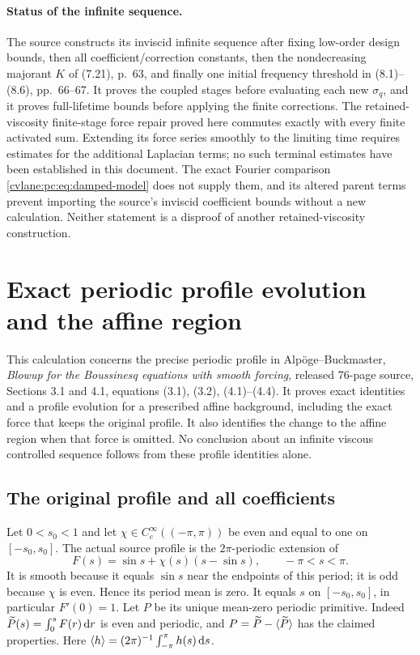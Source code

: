 \paragraph{Status of the infinite sequence.}
The source constructs its inviscid infinite sequence after fixing low-order design bounds, then all coefficient/correction constants, then the nondecreasing majorant $K$ of (7.21), p.~63, and finally one initial frequency threshold in (8.1)--(8.6), pp.~66--67. It proves the coupled stages before evaluating each new $\sigma_q$, and it proves full-lifetime bounds before applying the finite corrections. The retained-viscosity finite-stage force repair proved here commutes exactly with every finite activated sum. Extending its force series smoothly to the limiting time requires estimates for the additional Laplacian terms; no such terminal estimates have been established in this document. The exact Fourier comparison \eqref{cvlane:pc:eq:damped-model} does not supply them, and its altered parent terms prevent importing the source's inviscid coefficient bounds without a new calculation. Neither statement is a disproof of another retained-viscosity construction.


\section{Exact periodic profile evolution and the affine region}
This calculation concerns the precise periodic profile in Alp\"oge--Buckmaster,
\emph{Blowup for the Boussinesq equations with smooth forcing}, released
76-page source, Sections 3.1 and 4.1, equations (3.1), (3.2), (4.1)--(4.4).
It proves exact identities and a profile evolution for a prescribed affine
background, including the exact force that keeps the original profile.
It also identifies the change to the affine region when that force is
omitted. No conclusion about an infinite viscous controlled sequence follows
from these profile identities alone.

\subsection{The original profile and all coefficients}

Let $0<s_0<1$ and let $\chi\in C_c^\infty((-\pi,\pi))$ be even and equal to
one on $[-s_0,s_0]$. The actual source profile is the $2\pi$-periodic extension
of
\begin{equation}\label{cvlane:pd:eq:F}
 F(s)=\sin s+\chi(s)(s-\sin s),\qquad -\pi<s<\pi.
\end{equation}
It is smooth because it equals $\sin s$ near the endpoints of this period;
it is odd because $\chi$ is even. Hence its period mean is zero. It equals
$s$ on $[-s_0,s_0]$, in particular $F'(0)=1$. Let $P$ be its unique
mean-zero periodic primitive. Indeed
$\widetilde P(s)=\int_0^s F(r)\,\mathrm d r$ is even and periodic, and
$P=\widetilde P-\langle \widetilde P\rangle$ has the claimed properties. Here
$\langle h\rangle=(2\pi)^{-1}\int_{-\pi}^{\pi}h(s)\,\mathrm d s$.

